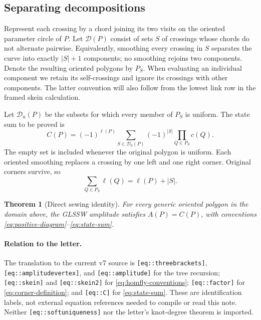 \documentclass[11pt,letterpaper]{article}
\numberwithin{equation}{section}
\newtheorem{theorem}{Theorem}[section]
\theoremstyle{definition}
\theoremstyle{remark}
\newcommand{\Dcal}{\mathcal D}
\newcommand{\vseven}[1]{\texttt{[eq::#1]}}
\begin{document}
\subsection{Separating decompositions}

Represent each crossing by a chord joining its two visits on the oriented
parameter circle of \(P\). Let \(\Dcal(P)\) consist of sets \(S\) of
crossings whose chords do not alternate pairwise. Equivalently, smoothing
every crossing in \(S\) separates the curve into exactly \(|S|+1\)
components; no smoothing rejoins two components. Denote the resulting
oriented polygons by \(P_S\). When evaluating an individual component we
retain its self-crossings and ignore its crossings with other components.
The latter convention will also follow from the lowest link row in the
framed skein calculation.

Let \(\Dcal_{\mathrm u}(P)\) be the subsets for which every member of
\(P_S\) is uniform. The state sum to be proved is
\begin{equation}
 C(P)=(-1)^{\ell(P)}
 \sum_{S\in\Dcal_{\mathrm u}(P)}(-1)^{|S|}
 \prod_{Q\in P_S}c(Q).
 \label{eq:state-sum}
\end{equation}
The empty set is included whenever the original polygon is uniform.
Each oriented smoothing replaces a crossing by one left and one right
corner. Original corners survive, so
\begin{equation}
 \sum_{Q\in P_S}\ell(Q)=\ell(P)+|S|.
 \label{eq:left-count}
\end{equation}

\begin{theorem}[Direct sewing identity]
\label{thm:main}
For every generic oriented polygon in the domain above, the GLSSW
amplitude satisfies \(A(P)=C(P)\), with conventions
\eqref{eq:positive-diagram}--\eqref{eq:state-sum}.
\end{theorem}

\paragraph{Relation to the letter.}
\begingroup\raggedright
The translation to the current v7 source is
\vseven{threebrackets}, \vseven{amplitudevertex}, and \vseven{amplitude}
for the tree recursion; \vseven{skein} and \vseven{skein2} for
\eqref{eq:homfly-conventions}; \vseven{factor} for
\eqref{eq:corner-definition}; and \vseven{C} for
\eqref{eq:state-sum}. These are identification labels, not external
equation references needed to compile or read this note. Neither
\vseven{softuniqueness} nor the letter's knot-degree theorem is imported.
\par\endgroup
\end{document}
